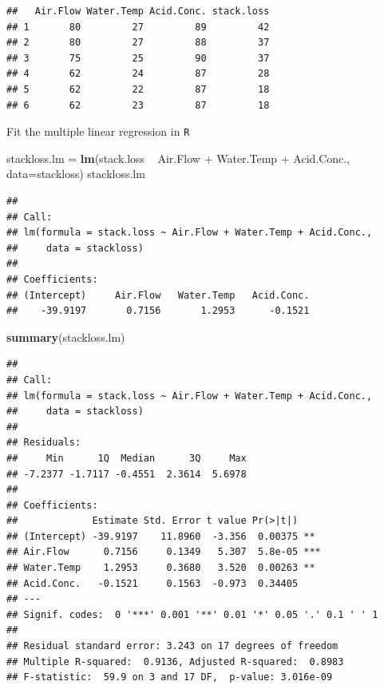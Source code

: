\documentclass[]{article}
\newenvironment{Shaded}{\begin{snugshade}}{\end{snugshade}}
\newcommand{\KeywordTok}[1]{\textcolor[rgb]{0.13,0.29,0.53}{\textbf{{#1}}}}
\newcommand{\DataTypeTok}[1]{\textcolor[rgb]{0.13,0.29,0.53}{{#1}}}
\newcommand{\StringTok}[1]{\textcolor[rgb]{0.31,0.60,0.02}{{#1}}}
\newcommand{\NormalTok}[1]{{#1}}
\numberwithin{equation}{section}
\begin{document}
\begin{verbatim}
##   Air.Flow Water.Temp Acid.Conc. stack.loss
## 1       80         27         89         42
## 2       80         27         88         37
## 3       75         25         90         37
## 4       62         24         87         28
## 5       62         22         87         18
## 6       62         23         87         18
\end{verbatim}

Fit the multiple linear regression in \texttt{R}

\begin{Shaded}
\begin{Highlighting}[]
\NormalTok{stackloss.lm =}\StringTok{ }\KeywordTok{lm}\NormalTok{(stack.loss ~}\StringTok{ }\NormalTok{Air.Flow +}\StringTok{ }\NormalTok{Water.Temp +}\StringTok{ }\NormalTok{Acid.Conc., }\DataTypeTok{data=}\NormalTok{stackloss) }
\NormalTok{stackloss.lm}
\end{Highlighting}
\end{Shaded}

\begin{verbatim}
## 
## Call:
## lm(formula = stack.loss ~ Air.Flow + Water.Temp + Acid.Conc., 
##     data = stackloss)
## 
## Coefficients:
## (Intercept)     Air.Flow   Water.Temp   Acid.Conc.  
##    -39.9197       0.7156       1.2953      -0.1521
\end{verbatim}

\begin{Shaded}
\begin{Highlighting}[]
\KeywordTok{summary}\NormalTok{(stackloss.lm)}
\end{Highlighting}
\end{Shaded}

\begin{verbatim}
## 
## Call:
## lm(formula = stack.loss ~ Air.Flow + Water.Temp + Acid.Conc., 
##     data = stackloss)
## 
## Residuals:
##     Min      1Q  Median      3Q     Max 
## -7.2377 -1.7117 -0.4551  2.3614  5.6978 
## 
## Coefficients:
##             Estimate Std. Error t value Pr(>|t|)    
## (Intercept) -39.9197    11.8960  -3.356  0.00375 ** 
## Air.Flow      0.7156     0.1349   5.307  5.8e-05 ***
## Water.Temp    1.2953     0.3680   3.520  0.00263 ** 
## Acid.Conc.   -0.1521     0.1563  -0.973  0.34405    
## ---
## Signif. codes:  0 '***' 0.001 '**' 0.01 '*' 0.05 '.' 0.1 ' ' 1
## 
## Residual standard error: 3.243 on 17 degrees of freedom
## Multiple R-squared:  0.9136, Adjusted R-squared:  0.8983 
## F-statistic:  59.9 on 3 and 17 DF,  p-value: 3.016e-09
\end{verbatim}
\end{document}

